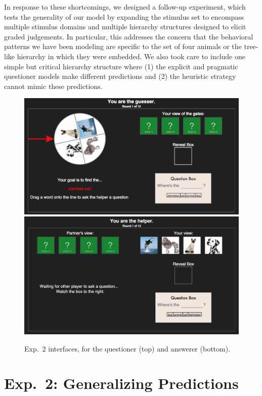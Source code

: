 \documentclass[12pt, floatsintext, jou]{apa6}
\begin{document}
In response to these shortcomings, we designed a follow-up experiment, which tests the generality of our model by expanding the stimulus set to encompass multiple stimulus domains and multiple hierarchy structures designed to elicit graded judgements. In particular, this addresses the concern that the behavioral patterns we have been modeling are specific to the set of four animals or the tree-like hierarchy in which they were embedded. We also took care to include one simple but critical hierarchy structure where (1) the explicit and pragmatic questioner models make different predictions and (2) the heuristic strategy cannot mimic these predictions. 
	\begin{figure}[t!]
\begin{center}
\includegraphics[scale = .3]{Exp4GuesserViewStart}
\includegraphics[scale = .15]{Exp4HelperViewStart}
\end{center}
\caption{Exp.~2 interfaces, for the questioner (top) and answerer (bottom).}
\label{fig:exp4views}
\end{figure}
\section{Exp.~2: Generalizing Predictions}
\end{document}
